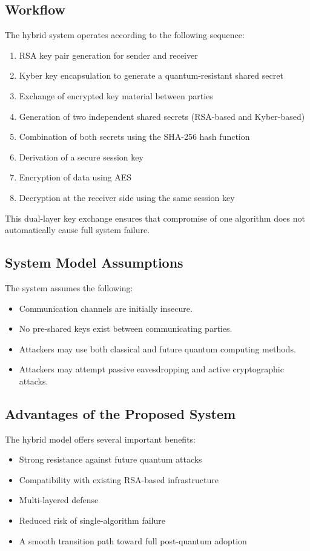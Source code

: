 \documentclass[12pt,a4paper]{article}
\begin{document}
\subsection{Workflow}

The hybrid system operates according to the following sequence:
\begin{enumerate}[leftmargin=2em]
    \item RSA key pair generation for sender and receiver
    \item Kyber key encapsulation to generate a quantum-resistant shared secret
    \item Exchange of encrypted key material between parties
    \item Generation of two independent shared secrets (RSA-based and Kyber-based)
    \item Combination of both secrets using the SHA-256 hash function
    \item Derivation of a secure session key
    \item Encryption of data using AES
    \item Decryption at the receiver side using the same session key
\end{enumerate}

This dual-layer key exchange ensures that compromise of one algorithm does not automatically cause full system failure.

\subsection{System Model Assumptions}

The system assumes the following:
\begin{itemize}[leftmargin=2em]
    \item Communication channels are initially insecure.
    \item No pre-shared keys exist between communicating parties.
    \item Attackers may use both classical and future quantum computing methods.
    \item Attackers may attempt passive eavesdropping and active cryptographic attacks.
\end{itemize}

\subsection{Advantages of the Proposed System}

The hybrid model offers several important benefits:
\begin{itemize}[leftmargin=2em]
    \item Strong resistance against future quantum attacks
    \item Compatibility with existing RSA-based infrastructure
    \item Multi-layered defense
    \item Reduced risk of single-algorithm failure
    \item A smooth transition path toward full post-quantum adoption
\end{itemize}
\end{document}

